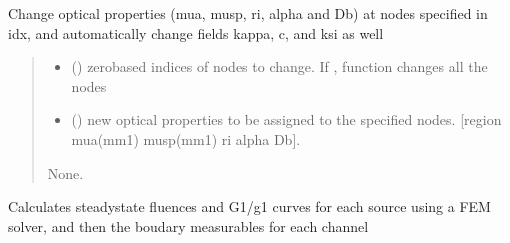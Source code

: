 \documentclass[letterpaper,10pt,english]{sphinxmanual}
\begin{document}
\begin{fulllineitems}
\begin{fulllineitems}
\label{\detokenize{_autosummary/nirfasterff.base.dcs_mesh.dcsmesh:nirfasterff.base.dcs_mesh.dcsmesh.change_prop}}
\pysigstartsignatures
\pysiglinewithargsret
{}
{\sphinxparamcomma {}}
{}
\pysigstopsignatures
\sphinxAtStartPar
Change optical properties (mua, musp, ri, alpha and Db) at nodes specified in idx, and automatically change fields kappa, c, and ksi as well
\begin{quote}\begin{description}
\begin{itemize}
\item {} 
\sphinxAtStartPar
{} () \textendash{} zero\sphinxhyphen{}based indices of nodes to change. If , function changes all the nodes

\item {} 
\sphinxAtStartPar
{} () \textendash{} new optical properties to be assigned to the specified nodes. {[}region mua(mm\sphinxhyphen{}1) musp(mm\sphinxhyphen{}1) ri alpha Db{]}.

\end{itemize}

\sphinxAtStartPar
None.

\end{description}\end{quote}

\end{fulllineitems}


\begin{fulllineitems}
\label{\detokenize{_autosummary/nirfasterff.base.dcs_mesh.dcsmesh:nirfasterff.base.dcs_mesh.dcsmesh.femdata}}
\pysigstartsignatures
\pysiglinewithargsret
{}
{\sphinxparamcomma {}\sphinxparamcomma {}}
{}
\pysigstopsignatures
\sphinxAtStartPar
Calculates steady\sphinxhyphen{}state fluences and G1/g1 curves for each source using a FEM solver, and then the boudary measurables for each channel


\end{fulllineitems}
\end{fulllineitems}
\end{document}
